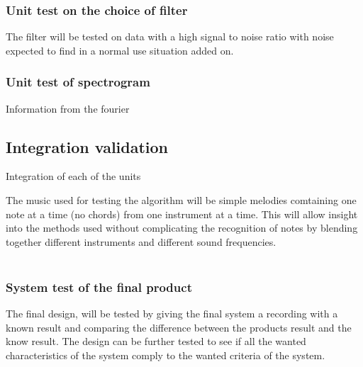 \subsubsection{Unit test on the choice of filter}
The filter will be tested on data with a high signal to noise ratio with noise expected to find in a normal use situation added on.
\subsubsection{Unit test of spectrogram}
Information from the fourier 

\subsection{Integration validation}
Integration of each of the units 

The music used for testing the algorithm will be simple melodies comtaining one note at a time (no chords) from one instrument at a time. This will allow insight into the methods used without complicating the recognition of notes by blending together different instruments and different sound frequencies.\\\\

\subsubsection{System test of the final product}
The final design, will be tested by giving the final system a recording with a known result and comparing the difference between the products result and the know result. The design can be further tested to see if all the wanted characteristics of the system comply to the wanted criteria of the system.


